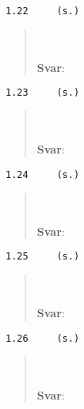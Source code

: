 \documentclass[a4paper]{article}
\newcommand{\tskcol}[1]{\textcolor{tskcol}{#1}}
\begin{document}
\texttt{\tskcol{1.22~~~~ (s.)}}
\begin{quotation}
	\noindent
	\\ \\
	\textbf{Svar}:
\end{quotation}

\texttt{\tskcol{1.23~~~~ (s.)}}
\begin{quotation}
	\noindent
	\\ \\
	\textbf{Svar}:
\end{quotation}

\texttt{\tskcol{1.24~~~~ (s.)}}
\begin{quotation}
	\noindent
	\\ \\
	\textbf{Svar}:
\end{quotation}

\texttt{\tskcol{1.25~~~~ (s.)}}
\begin{quotation}
	\noindent
	\\ \\
	\textbf{Svar}:
\end{quotation}

\texttt{\tskcol{1.26~~~~ (s.)}}
\begin{quotation}
	\noindent
	\\ \\
	\textbf{Svar}:
\end{quotation}
\end{document}
